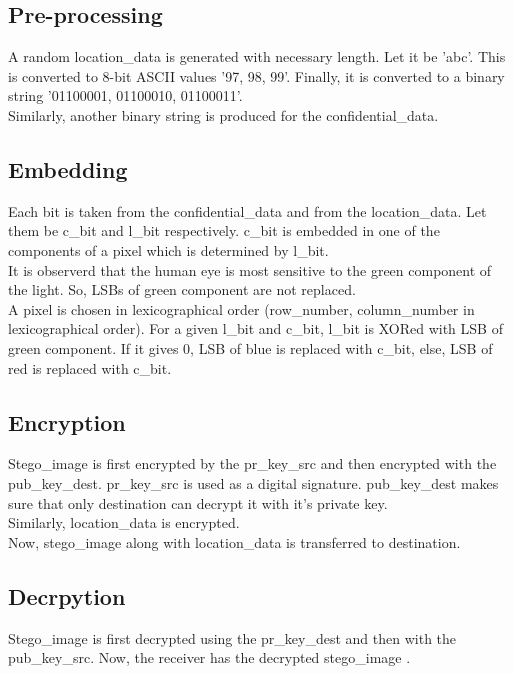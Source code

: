 \documentclass[conference]{IEEEtran}
\begin{document}
\subsection{Pre-processing}
A random location\_data is generated with necessary length. Let it be 'abc'.
This is converted to 8-bit ASCII values '97, 98, 99'.
Finally, it is converted to a binary string '01100001, 01100010, 01100011'.\\

Similarly, another binary string is produced for the confidential\_data.\\

\subsection{Embedding}
Each bit is taken from the confidential\_data and from the location\_data.
Let them be c\_bit and l\_bit respectively.
c\_bit is embedded in one of the components of a pixel which is determined by l\_bit.\\

It is observerd that the human eye is most sensitive to the green component of the light.
So, LSBs of green component are not replaced.\\

A pixel is chosen in lexicographical order (row\_number, column\_number in lexicographical order).
For a given l\_bit and c\_bit, l\_bit is XORed with LSB of green component.
If it gives 0, LSB of blue is replaced with c\_bit, else, LSB of red is replaced with c\_bit.\\

\subsection{Encryption}
Stego\_image is first encrypted by the pr\_key\_src and then encrypted with the pub\_key\_dest.
pr\_key\_src is used as a digital signature.
pub\_key\_dest makes sure that only destination can decrypt it with it's private key.\\

Similarly, location\_data is encrypted.\\

Now, stego\_image along with location\_data is transferred to destination.

\subsection{Decrpytion}
Stego\_image is first decrypted using the pr\_key\_dest and then with the pub\_key\_src.
Now, the receiver has the decrypted stego\_image .\\
\end{document}
